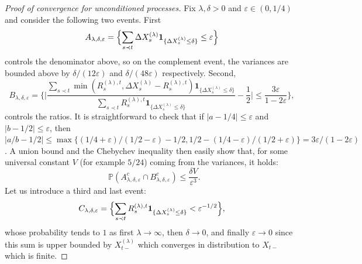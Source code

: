 \documentclass[british, a4paper,11pt]{article}
\numberwithin{equation}{section}
\theoremstyle{definition}
\renewcommand{\P}{\mathop{}\!\mathbb{P}}
\newcommand{\ind}[1]{\mathbf{1}_{\{#1\}}}
\begin{document}
\begin{proof}[Proof of convergence for unconditioned processes]
Fix $\lambda, \delta > 0$ and $\varepsilon \in (0, 1/4)$ and consider the following two events.
First
\[A_{\lambda, \delta, \varepsilon} = \Bigl\{\sum_{s \prec t} \Delta X^{(\lambda)}_s \ind{\Delta X^{(\lambda)}_s \leq \delta} \leq \varepsilon\Bigr\}
\]
controls the denominator above, so on the complement event, the variances are bounded above by $\delta/(12 \varepsilon)$ and $\delta/(48 \varepsilon)$ respectively. 
Second,
\[B_{\lambda, \delta, \varepsilon} = \biggl\{\biggl|\frac{\sum_{s \prec t} \min(R^{(\lambda), t}_s, \Delta X^{(\lambda)}_s-R^{(\lambda), t}_s) \ind{\Delta X^{(\lambda)}_s\leq \delta}}{\sum_{s \prec t} R^{(\lambda), t}_s \ind{\Delta X^{(\lambda)}_s\leq \delta}} - \frac{1}{2}\biggr| \le \frac{3\varepsilon}{1-2\varepsilon}\biggr\},\]
controls the ratios.
It is straightforward to check that if $|a-1/4| \le \varepsilon$ and $|b - 1/2| \le \varepsilon$, then 
$|a/b - 1/2| 
\le 
\max\{(1/4 + \varepsilon)/(1/2 - \varepsilon) - 1/2, 1/2 - (1/4 - \varepsilon)/(1/2 + \varepsilon)\} = 
3 \varepsilon / (1-2\varepsilon)$.
A union bound and the Chebychev inequality then easily show that, for some universal constant $V$ (for example $5/24$) coming from the variances, it holds:
\[\P(A_{\lambda, \delta, \varepsilon}^c \cap B_{\lambda, \delta, \varepsilon}^c)
\leq \frac{\delta V}{\varepsilon^3}.\]
Let us introduce a third and last event:
\[C_{\lambda, \delta, \varepsilon} = \Bigl\{\sum_{s \prec t} R^{(\lambda), t}_s \ind{\Delta X^{(\lambda)}_s\leq \delta} < \varepsilon^{-1/2}\Bigr\}
,\]
whose probability tends to $1$ as first $\lambda\to\infty$, then $\delta\to0$, and finally $\varepsilon\to0$ since this sum is upper bounded by $X^{(\lambda)}_{t-}$ which converges in distribution to $X_{t-}$ which is finite.


\end{proof}
\end{document}
